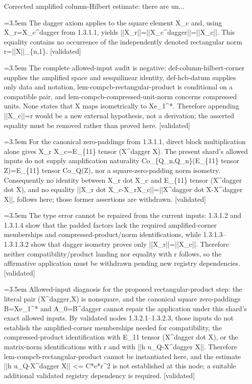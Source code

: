 \documentclass{article}
\newcommand{\step}[1]{\par\noindent\hangindent=3.5em\hangafter=1%
  \makebox[3.5em][l]{\textbf{#1.}}}
\newcommand{\steptag}[1]{\hfill{\small\textsf{[#1]}}}
\begin{document}
\begin{proofbox}{Corrected amplified column-Hilbert estimate: there are un...}
\step{1.3.1.3.1} The dagger axiom applies to the square element X\_c and, using X\_r=X\_c\textasciicircum{}dagger from 1.3.1.1, yields ||X\_r||=||X\_c\textasciicircum{}dagger||=||X\_c||. This equality contains no occurrence of the independently denoted rectangular norm r=||X||\_\{n,1\}. \steptag{validated} \\[4pt]
\step{1.3.1.3.2} The complete allowed-input audit is negative: def-column-hilbert-corner supplies the amplified space and sesquilinear identity, def-hcb-datum supplies only data and notation, lem-compcb-rectangular-product is conditional on a compatible pair, and lem-compcb-compressed-unit-norm concerns compressed units. None states that X maps isometrically to Xe\_1\textasciicircum{}*. Therefore appending ||X\_c||=r would be a new external hypothesis, not a derivation; the asserted equality must be removed rather than proved here. \steptag{validated} \\[4pt]
\step{1.3.1.4} For the canonical zero-paddings from 1.3.1.1, direct block multiplication alone gives X\_r X\_c=E\_\{11\} tensor (X\textasciicircum{}dagger X). The present shard's allowed inputs do not supply amplification naturality Co\_\{Q\_n,Q\_n\}(E\_\{11\} tensor Z)=E\_\{11\} tensor Co\_Q(Z), nor a square-zero-padding norm isometry. Consequently no identity between X\_r dot X\_c and E\_\{11\} tensor (X\textasciicircum{}dagger dot X), and no equality ||X\_r dot X\_c-X\_rX\_c||=||X\textasciicircum{}dagger dot X-X\textasciicircum{}dagger X||, follows here; those former assertions are withdrawn. \steptag{validated} \\[4pt]
\step{1.3.1.5} The type error cannot be repaired from the current inputs: 1.3.1.2 and 1.3.1.4 show that the padded factors lack the required amplified-corner memberships and compressed-product/norm identifications, while 1.3.1.3--1.3.1.3.2 show that dagger isometry proves only ||X\_r||=||X\_c||. Therefore neither compatibility/product landing nor equality with r follows, so the affirmative application must be withdrawn pending new registry dependencies. \steptag{validated} \\[4pt]
\step{1.3.2} Allowed-input diagnosis for the proposed rectangular-product step: the literal pair (X\textasciicircum{}dagger,X) is nonsquare, and the canonical square zero-paddings B=Xe\_1\textasciicircum{}* and A\_0=B\textasciicircum{}dagger cannot repair the application under this shard's exact allowed inputs. By validated nodes 1.3.2.1--1.3.2.3, those inputs do not establish the amplified-corner memberships needed for compatibility, the compressed-product identification with E\_11 tensor (X\textasciicircum{}dagger dot X), or the matrix-norm identifications with r and with ||h u\_Q-X\textasciicircum{}dagger X||. Therefore lem-compcb-rectangular-product cannot be instantiated here, and the estimate ||h u\_Q-X\textasciicircum{}dagger X|| <= C*e*r\textasciicircum{}2 is not established at this node; a suitable additional validated registry dependency is required. \steptag{validated} \\[6pt]

\end{proofbox}
\end{document}
